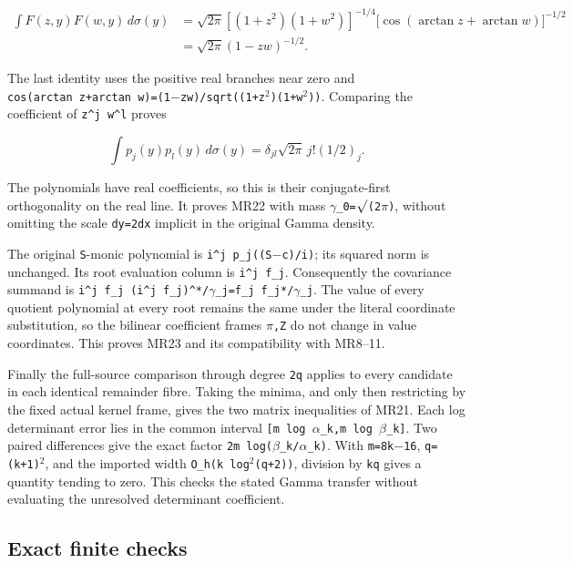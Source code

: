 \[
\begin{aligned}
\int F(z,y)F(w,y)\,d\sigma(y)
&=\sqrt{2\pi}[(1+z^2)(1+w^2)]^{-1/4}
\bigl[\cos(\arctan z+\arctan w)\bigr]^{-1/2}\\
&=\sqrt{2\pi}(1-zw)^{-1/2}.
\end{aligned}
\]

The last identity uses the positive real branches near zero and \texttt{cos(arctan\ z+arctan\ w)=(1\ensuremath{-}zw)/sqrt((1+z\ensuremath{{}^2})(1+w\ensuremath{{}^2}))}. Comparing the coefficient of \texttt{z\^{}j\ w\^{}l} proves

\[
\int p_j(y)p_l(y)\,d\sigma(y)
=\delta_{jl}\sqrt{2\pi}\,j!(1/2)_j.
\]

The polynomials have real coefficients, so this is their conjugate-first orthogonality on the real line. It proves MR22 with mass \texttt{\ensuremath{\gamma}\_0=\ensuremath{\surd}(2\ensuremath{\pi})}, without omitting the scale \texttt{dy=2dx} implicit in the original Gamma density.

The original \texttt{S}-monic polynomial is \texttt{i\^{}j\ p\_j((S\ensuremath{-}c)/i)}; its squared norm is unchanged. Its root evaluation column is \texttt{i\^{}j\ f\_j}. Consequently the covariance summand is \texttt{i\^{}j\ f\_j\ (i\^{}j\ f\_j)\^{}*/\ensuremath{\gamma}\_j=f\_j\ f\_j*/\ensuremath{\gamma}\_j}. The value of every quotient polynomial at every root remains the same under the literal coordinate substitution, so the bilinear coefficient frames \texttt{\ensuremath{\pi},Z} do not change in value coordinates. This proves MR23 and its compatibility with MR8--11.

Finally the full-source comparison through degree \texttt{2q} applies to every candidate in each identical remainder fibre. Taking the minima, and only then restricting by the fixed actual kernel frame, gives the two matrix inequalities of MR21. Each log determinant error lies in the common interval \texttt{{[}m\ log\ \ensuremath{\alpha}\_k,m\ log\ \ensuremath{\beta}\_k{]}}. Two paired differences give the exact factor \texttt{2m\ log(\ensuremath{\beta}\_k/\ensuremath{\alpha}\_k)}. With \texttt{m=8k\ensuremath{-}16}, \texttt{q=(k+1)\ensuremath{{}^2}}, and the imported width \texttt{O\_h(k\ log\ensuremath{{}^2}(q+2))}, division by \texttt{kq} gives a quantity tending to zero. This checks the stated Gamma transfer without evaluating the unresolved determinant coefficient.

\subsection{Exact finite checks}\label{mrreview:exact-finite-checks}

